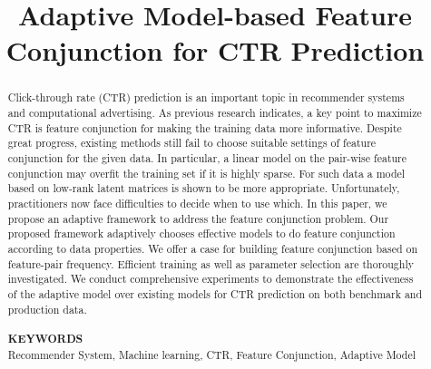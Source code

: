 \documentclass[sigconf,review]{acmart}
\begin{document}
\newcommand{\tabincell}[2]{\begin{tabular}{@{}#1@{}}#2\end{tabular}}
\title{Adaptive Model-based Feature Conjunction for CTR Prediction}
\begin{abstract}
Click-through rate (CTR) prediction is an important topic in recommender systems and computational advertising. As previous research indicates, a key point to maximize CTR is feature conjunction for making the training data more informative. Despite great progress, existing methods still fail to choose suitable settings of feature conjunction for the given data. In particular, a linear model on the pair-wise feature conjunction may overfit the training set if it is highly sparse. For such data a model based on low-rank latent matrices is shown to be more appropriate. Unfortunately, practitioners now face difficulties to decide when to use which. In this paper, we propose an adaptive framework to address the feature conjunction problem. Our proposed framework adaptively chooses effective models to do feature conjunction according to data properties. We offer a case for building feature conjunction based on feature-pair frequency. Efficient training as well as parameter selection are thoroughly investigated. We conduct comprehensive experiments to demonstrate the effectiveness of the adaptive model over existing models for CTR prediction on both benchmark and production data.\\\\
\textbf{KEYWORDS}\\
Recommender System, Machine learning, CTR, Feature Conjunction, Adaptive Model\\
\end{abstract}

\maketitle










\end{document}

